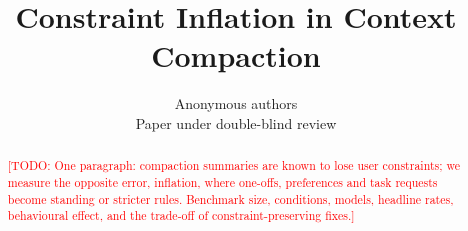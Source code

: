 \documentclass[10pt]{article} %
\title{Constraint Inflation in Context Compaction}
\author{\name Anonymous authors \\
      \addr Paper under double-blind review}
\newcommand{\todo}[1]{\textcolor{red}{[TODO: #1]}}
\begin{document}
\maketitle

\begin{abstract}
\todo{One paragraph: compaction summaries are known to lose user constraints; we measure the
opposite error, inflation, where one-offs, preferences and task requests become standing or
stricter rules. Benchmark size, conditions, models, headline rates, behavioural effect, and the
trade-off of constraint-preserving fixes.}
\end{abstract}












\appendix


\end{document}
